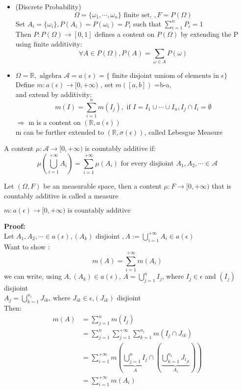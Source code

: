 \begin{itemize}
\item (Discrete Probability)
$$
    \Omega=\{\omega_1,\cdots,\omega_n\} \text{ finite set, }, F=P(\Omega)
$$ 
Set $ A_i=\{\omega_i\} ,P(A_i)=P(\omega_i)=P_i  $ such that $\sum_{i=1}^{n}P_i=1$
\\Then $ P:P(\Omega)\rightarrow[0,1] $ defines a content on $ P(\Omega) $ by extending the P using finite additivity:
$$
    \forall A\in P(\Omega), P(A)=\sum_{\omega\in A}P(\omega)
$$  
\item $ \Omega=\mathbb{R},\text{ algebra }\mathcal{A} =a(\epsilon)=\{\text{ finite disjoint umiom of elements in }\epsilon\} $ 
\\Define $ m:a(\epsilon)\rightarrow [0,+\infty) $ , set $ m([a,b]) $ =b-a,
\\and extend by additivity:$$
    m(I)=\sum_{i=1}^{n}m(I_j), \text{ if } I=I_1\cup\cdots\cup I_n, I_j\cap I_i=\emptyset
$$ 
$\Rightarrow$ m is a content on $ (\mathbb{R},a(\epsilon))$
\\m can be further extended to $ (\mathbb{R},\sigma(\epsilon)) $, called Lebesgue Measure
\end{itemize}
\begin{definition}{}
A content $ \mu:\mathcal{A} \rightarrow[0,+\infty) $ is countably additive if:$$
    \mu(\bigcup_{i=1}^{+\infty}A_i)=\sum_{i=1}^{+\infty}\mu(A_i) \text{ for every disjioint }A_1,A_2,\cdots \in \mathcal{A}
$$  
\end{definition}
\begin{definition}[measure]{}
Let $ (\Omega,F) $ be an measurable space, then a content $ \mu:F\rightarrow [0,+\infty) $ that is countably additive is called a measure 
\end{definition}
\begin{lemma}[]{}
$ m:a(\epsilon)\rightarrow[0,+\infty) \text{ is countably additive} $ 
\end{lemma}
\textbf{Proof:}
\\Let $ A_1,A_2,\cdots \in a(\epsilon),(A_k) \text{ disjioint },A:=\bigcup_{i=1}^{+\infty}A_i\in a(\epsilon) $
\\Want to show :$$
    m(A)=\sum_{i=1}^{+\infty}m(A_i)
$$ 
we can write, using $ A,(A_k)  \in  a(\epsilon) $, $ A=\bigcup_{j=1}^{n}I_j$, where $ I_j \in \epsilon$ and $ (I_j) $ disjioint 
\\$ A_j=\bigcup_{k=1}^{n_i}J_{ik} $, where $ J_{ik}\in\epsilon $,$ (J_{ik}) $ disjioint
\\Then:\begin{align*}{}{}
m(A)&=\sum_{j=1}^{n}m(I_j)\\
&=\sum_{j=1}^{n}\sum_{j=1}^{+\infty}\sum_{k=1}^{n_i}m(I_j\cap J_{ik})\\
&=\sum_{i=1}^{+\infty}m(\underbrace{\bigcup_{j=1}^{n}I_j}_A\cap (\underbrace{\bigcup_{k=1}^{n_i}J_{i_{jk}}}_{A_i}))\\
&=\sum_{i=1}^{+\infty}m(A_i)
\end{align*}   
